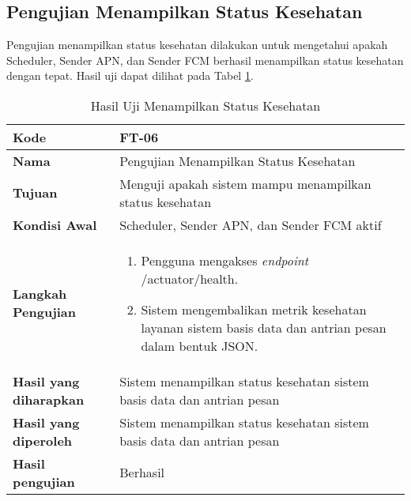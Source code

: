 \subsection{Pengujian Menampilkan Status Kesehatan}
\par Pengujian menampilkan status kesehatan dilakukan untuk mengetahui apakah Scheduler, Sender APN, dan Sender FCM berhasil menampilkan status kesehatan dengan tepat. Hasil uji dapat dilihat pada Tabel \ref{t:uji_menampilkan_status_kesehatan}.
\begin{longtable}{|p{3cm}|p{6.5cm}|}
	\caption{Hasil Uji Menampilkan Status Kesehatan} \label{t:uji_menampilkan_status_kesehatan} \\ \hline
	\textbf{Kode} & FT-06 \\ \hline
	\textbf{Nama} & Pengujian Menampilkan Status Kesehatan \\ \hline
	\textbf{Tujuan} & Menguji apakah sistem mampu menampilkan status kesehatan \\ \hline
	\textbf{Kondisi Awal} & Scheduler, Sender APN, dan Sender FCM aktif \\ \hline
	\textbf{Langkah Pengujian} &  
	\begin{enumerate}
		\item Pengguna mengakses \textit{endpoint} /actuator/health.
		\item Sistem mengembalikan metrik kesehatan layanan sistem basis data dan antrian pesan dalam bentuk JSON.
	\end{enumerate} \\ \hline
	\textbf{Hasil yang diharapkan} & Sistem menampilkan status kesehatan sistem basis data dan antrian pesan \\ \hline
	\textbf{Hasil yang diperoleh} & Sistem menampilkan status kesehatan sistem basis data dan antrian pesan \\ \hline
	\textbf{Hasil pengujian} & Berhasil \\ \hline
\end{longtable}

